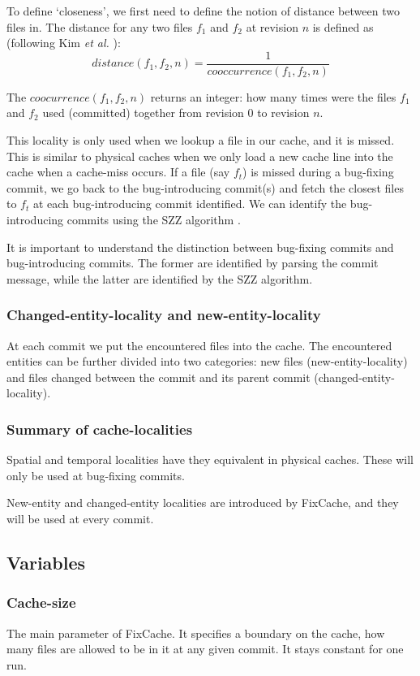 \documentclass[12pt,twoside,notitlepage]{report}
\newcommand{\fxch}{FixCache}
\newcommand{\etal}{\textit{et al.}}
\begin{document}
To define `closeness', we first need to define the notion of distance between two files in. The distance  for any two files $f_1$ and $f_2$ at revision $n$ is defined as (following Kim \etal{} \cite{FixCache}):
\vspace{0.2in}
\[
	distance(f_1, f_2, n) = \frac{1}{cooccurrence(f_1, f_2, n)}
\]

\vspace{0.2in}
The $coocurrence(f_1, f_2, n)$ returns an integer: how many times were the files $f_1$ and $f_2$ used (committed) together from revision $0$ to revision $n$.

This locality is only used when we lookup a file in our cache, and it is missed. This is similar to physical caches when we only load a new cache line into the cache when a cache-miss occurs. If a file (say $f_t$) is missed during a bug-fixing commit, we go back to the bug-introducing commit(s) and fetch the closest files to $f_t$ at each bug-introducing commit identified. We can identify the bug-introducing commits using the SZZ algorithm \cite{SZZ}.

It is important to understand the distinction between bug-fixing commits and bug-introducing commits. The former are identified by parsing the commit message, while the latter are identified by the SZZ algorithm.

\subsubsection{Changed-entity-locality and new-entity-locality}
At each commit we put the encountered files into the cache. The encountered entities can be further divided into two categories: new files (new-entity-locality) and files changed between the commit and its parent commit (changed-entity-locality).
\subsubsection{Summary of cache-localities}
Spatial and temporal localities have they equivalent in physical caches. These will only be used at bug-fixing commits.

New-entity and changed-entity localities are introduced by \fxch{}, and they will be used at every commit.
\subsection{Variables}\label{variables}
\subsubsection{Cache-size}
The main parameter of \fxch{}. It specifies a boundary on the cache, how many files are allowed to be in it at any given commit. It stays constant for one run.
\end{document}

